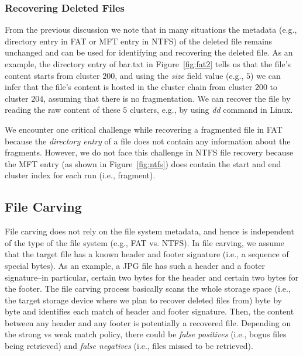 \subsubsection{Recovering Deleted Files}\label{subsubsec:meta-recovery}

From the previous discussion we note that in many situations the metadata
(e.g., directory entry in FAT or MFT entry in NTFS) of the deleted file remains
unchanged and can be used for identifying and recovering the deleted file.
As an example, the directory entry of bar.txt in Figure~\ref{fig:fat2} tells us
that the file's content starts from cluster $200$, 
and using the \emph{size} field value (e.g., $5$) we can infer that the file's content
is hosted in the cluster chain from cluster $200$ to cluster $204$, assuming that there is no
fragmentation. We can recover the file by reading the raw content of these $5$ clusters, e.g.,
by using \emph{dd} command in Linux.  

We encounter one critical challenge while recovering a fragmented file in FAT because the \emph{directory entry}
of a file does not contain any information about the fragments. However, we do not face this challenge 
in NTFS file recovery because the MFT entry (as shown in Figure~\ref{fig:ntfs}) does contain the start and end cluster index for each run (i.e., fragment). 

\subsection{File Carving}\label{subsec:file-carving}

File carving does not rely on the file system metadata, and hence is independent of the type of the 
file system (e.g., FAT vs. NTFS). In file carving, we assume that the target file has 
a known header and footer signature (i.e., a sequence of special bytes). As an example, 
a JPG file has such a header and a footer signature--in particular, certain two bytes 
for the header and certain two bytes for the footer. The file carving process basically
scans the whole storage space (i.e., the target storage device where we plan to recover deleted files from) 
byte by byte and identifies each match of header and footer signature. 
Then, the content between any header and any footer is potentially a recovered file. 
Depending on the strong vs weak match policy, there could be \emph{false positives} 
(i.e., bogus files being retrieved) 
and \emph{false negatives} (i.e., files missed to be retrieved). 

